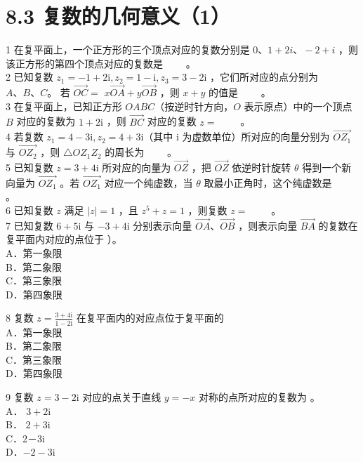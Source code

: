 \documentclass[10pt]{article}
\begin{document}
\section*{8.3 复数的几何意义（1）}
1 在复平面上，一个正方形的三个顶点对应的复数分别是 \(0 、 1+2 i 、-2+i\) ，则该正方形的第四个顶点对应的复数是 \(\qquad\)。\\
2 已知复数 \(z_{1}=-1+2 \mathrm{i}, z_{2}=1-\mathrm{i}, z_{3}=3-2 \mathrm{i}\) ，它们所对应的点分别为 \(A 、 B 、 C 。\) 若 \(\overrightarrow{O C}=\) \(x \overrightarrow{O A}+y \overrightarrow{O B}\) ，则 \(x+y\) 的值是 \(\qquad\)。\\
3 在复平面上，已知正方形 \(O A B C\)（按逆时针方向，\(O\) 表示原点）中的一个顶点 \(B\) 对应的复数为 \(1+2 \mathrm{i}\) ，则 \(\overrightarrow{B C}\) 对应的复数 \(z=\) \(\qquad\)。\\
4 若复数 \(z_{1}=4-3 \mathrm{i}, z_{2}=4+3 \mathrm{i}\)（其中 i 为虚数单位）所对应的向量分别为 \(\overrightarrow{O Z_{1}}\) 与 \(\overrightarrow{O Z_{2}}\) ，则 \(\triangle O Z_{1} Z_{2}\) 的周长为 \(\qquad\)。\\
5 已知复数 \(z=3+4 \mathrm{i}\) 所对应的向量为 \(\overrightarrow{O Z}\) ，把 \(\overrightarrow{O Z}\) 依逆时针旋转 \(\theta\) 得到一个新向量为 \(\overrightarrow{O Z_{1}}\) 。若 \(\overrightarrow{O Z_{1}}\) 对应一个纯虚数，当 \(\theta\) 取最小正角时，这个纯虚数是 \(\qquad\)。\\
6 已知复数 \(z\) 满足 \(|z|=1\) ，且 \(z^{5}+z=1\) ，则复数 \(z=\) \(\qquad\)。\\
7 已知复数 \(6+5 \mathrm{i}\) 与 \(-3+4 \mathrm{i}\) 分别表示向量 \(\overrightarrow{O A} 、 \overrightarrow{O B}\) ，则表示向量 \(\overrightarrow{B A}\) 的复数在复平面内对应的点位于 ）。\\
A．第一象限\\
B．第二象限\\
C．第三象限\\
D．第四象限

8 复数 \(z=\frac{3+4 \mathrm{i}}{1-2 \mathrm{i}}\) 在复平面内的对应点位于复平面的\\
A．第一象限\\
B．第二象限\\
C．第三象限\\
D．第四象限

9 复数 \(z=3-2 \mathrm{i}\) 对应的点关于直线 \(y=-x\) 对称的点所对应的复数为 。\\
A． \(3+2 \mathrm{i}\)\\
B． \(2+3 \mathrm{i}\)\\
C．2－3i\\
D．\(-2-3 \mathrm{i}\)
\end{document}
